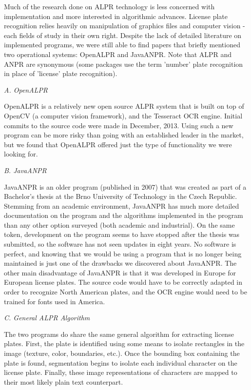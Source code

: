 \documentclass[11pt, oneside, fullpage, doublespace]{article}
\begin{document}
Much of the research done on ALPR technology is less concerned with implementation and more interested in algorithmic advances. License plate recognition relies heavily on manipulation of graphics files and computer vision - each fields of study in their own right. Despite the lack of detailed literature on implemented programs, we were still able to find papers that briefly mentioned two operational systems: OpenALPR and JavaANPR. Note that ALPR and ANPR are synonymous (some packages use the term 'number' plate recognition in place of 'license' plate recognition).

\emph{A. OpenALPR}

OpenALPR is a relatively new open source ALPR system that is built on top of OpenCV (a computer vision framework), and the Tesseract OCR engine. Initial commits to the source code were made in December, 2013. Using such a new program can be more risky than going with an established leader in the market, but we found that OpenALPR offered just the type of functionality we were looking for.

\emph{B. JavaANPR}

JavaANPR is an older program (published in 2007) that was created as part of a Bachelor's thesis at the Brno University of Technology in the Czech Republic. Stemming from an academic environment, JavaANPR has much more detailed documentation on the program and the algorithms implemented in the program than any other option surveyed (both academic and industrial). On the same token, development on the program seems to have stopped after the thesis was submitted, so the software has not seen updates in eight years. No software is perfect, and knowing that we would be using a program that is no longer being maintained is just one of the drawbacks we discovered about JavaANPR. The other main disadvantage of JavaANPR is that it was developed in Europe for European license plates. The source code would have to be correctly adapted in order to recognize North American plates, and the OCR engine would need to be trained for fonts used in America.

\emph{C. General ALPR Algorithm}

The two programs do share the same general algorithm for extracting license plates. First, the plate is identified using some means to isolate rectangles in the image (texture, color, boundaries, etc.). Once the bounding box containing the plate is found, segmentation begins to isolate each individual character on the license plate. Finally, these image representations of characters are mapped to their most likely plain text counterpart.
\end{document}
